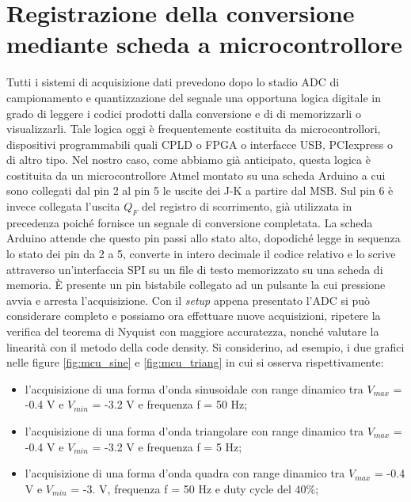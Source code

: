 \documentclass[journal]{IEEEtran}
\begin{document}
\section{Registrazione della conversione mediante scheda a microcontrollore}
Tutti i sistemi di acquisizione dati prevedono dopo lo stadio ADC di campionamento e quantizzazione del segnale una opportuna logica digitale in grado di leggere i codici prodotti dalla conversione e di di memorizzarli o visualizzarli. Tale logica oggi è frequentemente costituita da microcontrollori, dispositivi programmabili quali CPLD o FPGA o interfacce USB, PCIexpress o di altro tipo. Nel nostro caso, come abbiamo già anticipato, questa logica è costituita da un microcontrollore Atmel montato su una scheda Arduino a cui sono collegati dal pin 2 al pin 5 le uscite dei J-K a partire dal MSB. Sul pin 6 è invece collegata l'uscita $Q_F$ del registro di scorrimento, già utilizzata in precedenza poiché fornisce un segnale di conversione completata. La scheda Arduino attende che questo pin passi allo stato alto, dopodiché legge in sequenza lo stato dei pin da 2 a 5, converte in intero decimale il codice relativo e lo scrive attraverso un'interfaccia SPI su un file di testo memorizzato su una scheda di memoria. È presente un pin bistabile collegato ad un pulsante la cui pressione avvia e arresta l'acquisizione. Con il \textit{setup} appena presentato l'ADC si può considerare completo e possiamo ora effettuare nuove acquisizioni, ripetere la verifica del teorema di Nyquist con maggiore accuratezza, nonché valutare la linearità con il metodo della code density. Si considerino, ad esempio, i due grafici nelle figure \ref{fig:mcu_sine} e \ref{fig:mcu_triang} in cui si osserva rispettivamente:
\begin{itemize}
    \item l'acquisizione di una forma d'onda sinusoidale con range dinamico tra $V_{max}$ = -0.4 V e $V_{min}$ = -3.2 V e frequenza f = 50 Hz;
    \item l'acquisizione di una forma d'onda triangolare con range dinamico tra $V_{max}$ = -0.4 V e $V_{min}$ = -3.2 V e frequenza f = 5 Hz;
    \item l'acquisizione di una forma d'onda quadra con range dinamico tra $V_{max}$ = -0.4 V e $V_{min}$ = -3. V, frequenza f = 50 Hz e duty cycle del $40 \%$;
\end{itemize}
\end{document}
